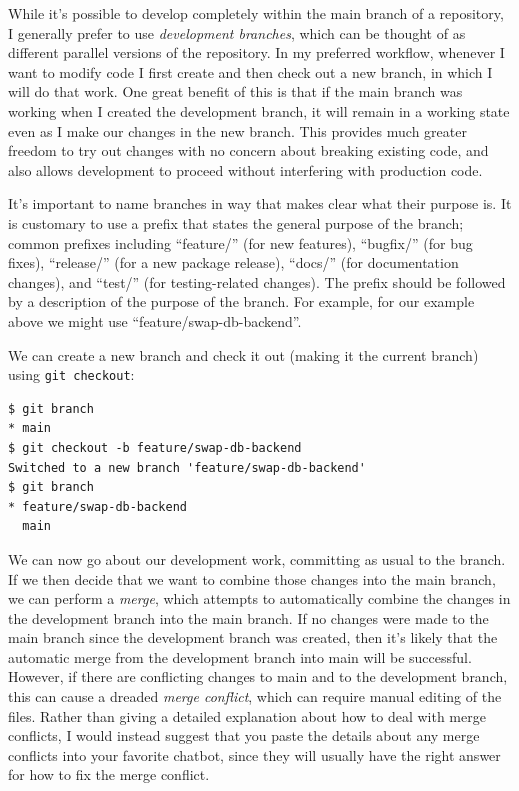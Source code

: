 While it's possible to develop completely within the main branch of a repository, I generally prefer to use \textit{development branches}, which can be thought of as different parallel versions of the repository.
In my preferred workflow, whenever I want to modify code I first create and then check out a new branch, in which I will do that work.
One great benefit of this is that if the main branch was working when I created the development branch, it will remain in a working state even as I make our changes in the new branch.
This provides much greater freedom to try out changes with no concern about breaking existing code, and also allows development to proceed without interfering with production code.

It's important to name branches in way that makes clear what their purpose is.
It is customary to use a prefix that states the general purpose of the branch; common prefixes including ``feature/'' (for new features), ``bugfix/'' (for bug fixes), ``release/'' (for a new package release), ``docs/'' (for documentation changes), and ``test/'' (for testing-related changes).
The prefix should be followed by a description of the purpose of the branch.
For example, for our example above we might use ``feature/swap-db-backend''.

We can create a new branch and check it out (making it the current branch) using \texttt{git checkout}:

\begin{lstlisting}[style=shell]
$ git branch
* main
$ git checkout -b feature/swap-db-backend
Switched to a new branch 'feature/swap-db-backend'
$ git branch
* feature/swap-db-backend
  main
\end{lstlisting}

We can now go about our development work, committing as usual to the branch.
If we then decide that we want to combine those changes into the main branch, we can perform a \textit{merge}, which attempts to automatically combine the changes in the development branch into the main branch.  If no changes were made to the main branch since the development branch was created, then it's likely that the automatic merge from the development branch into main will be successful.  However, if there are conflicting changes to main and to the development branch, this can cause a dreaded \textit{merge conflict}, which can require manual editing of the files.  Rather than giving a detailed explanation about how to deal with merge conflicts, I would instead suggest that you paste the details about any merge conflicts into your favorite chatbot, since they will usually have the right answer for how to fix the merge conflict.

